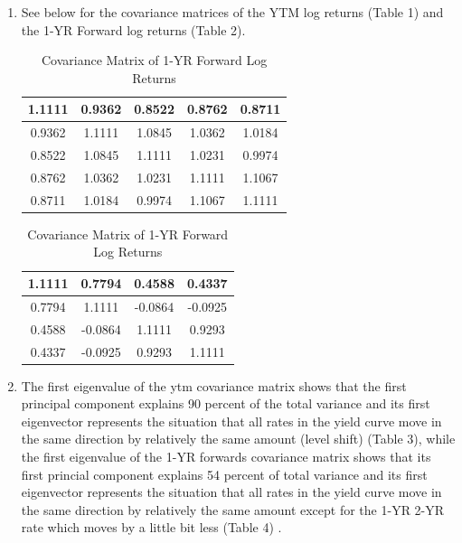 \documentclass{article}
\begin{document}
\begin{enumerate}
\begin{enumerate}
    \end{enumerate}
    \item See below for the covariance matrices of the YTM log returns (Table 1) and the 1-YR Forward log returns (Table 2).
        \begin{table}[H]
        \begin{minipage}{0.5\linewidth}
        \centering
        \caption{Covariance Matrix of YTM Log Returns}
        \begin{tabular}{|c|c|c|c|c|}
        \hline
        1.1111 & 0.9362 & 0.8522 & 0.8762 & 0.8711 \\ \hline
        0.9362 & 1.1111 & 1.0845 & 1.0362 & 1.0184 \\ \hline
        0.8522 & 1.0845 & 1.1111 & 1.0231 & 0.9974 \\ \hline
        0.8762 & 1.0362 & 1.0231 & 1.1111 & 1.1067 \\ \hline
        0.8711 & 1.0184 & 0.9974 & 1.1067 & 1.1111 \\ \hline
        \end{tabular}
        \end{minipage}
        \hfill
        \begin{minipage}{0.5\linewidth}
        \centering
        \caption{Covariance Matrix of 1-YR Forward Log Returns}
        \begin{tabular}{|c|c|c|c|}
        \hline
        1.1111 & 0.7794 & 0.4588 & 0.4337 \\ \hline
        0.7794 & 1.1111 & -0.0864 & -0.0925 \\ \hline
        0.4588 & -0.0864 & 1.1111 & 0.9293 \\ \hline
        0.4337 & -0.0925 & 0.9293 & 1.1111 \\ \hline
        \end{tabular}
        \end{minipage}
        \end{table}
    \item The first eigenvalue of the ytm covariance matrix shows that the first principal component explains 90 percent of the total variance and its first eigenvector represents the situation that all rates in the yield curve move in the same direction by relatively the same amount (level shift) (Table 3), while the first eigenvalue of the 1-YR forwards covariance matrix shows that its first princial component explains 54 percent of total variance and its first eigenvector represents the situation that all rates in the yield curve move in the same direction by relatively the same amount except for the 1-YR 2-YR rate which moves by a little bit less (Table 4) \cite{pca2023yield}.


\end{enumerate}
\end{document}
